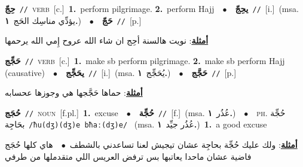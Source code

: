 \documentclass[10pt,a4paper,twoside]{article} %
\begin{document}
\begin{multicols}{2}
{{{{{{{{{{{\setlength\topsep{0pt}\textbf{\foreignlanguage{arabic}{حِجّ}}\ {\color{gray}\texttt{//}\color{black}}\ \textsc{verb}\ [c.]\ \textbf{1.}~perform pilgrimage.  \textbf{2.}~perform Hajj\ \ $\bullet$\ \ \setlength\topsep{0pt}\textbf{\foreignlanguage{arabic}{يحِجّ}}\ {\color{gray}\texttt{//}\color{black}}\ [i.]\ \color{gray}(msa. \foreignlanguage{arabic}{يؤدِّي مناسِك الحَج}~\foreignlanguage{arabic}{\textbf{١.}})\color{black}\ \ $\bullet$\ \ \setlength\topsep{0pt}\textbf{\foreignlanguage{arabic}{حَجّ}}\ {\color{gray}\texttt{//}\color{black}}\ [p.]\  \begin{flushright}\color{gray}\foreignlanguage{arabic}{\textbf{\underline{\foreignlanguage{arabic}{أمثلة}}}: نويت هالسنة أحِج ان شاء الله عروح إِمي الله يرحمها}\end{flushright}\color{black}} \vspace{2mm}

{\setlength\topsep{0pt}\textbf{\foreignlanguage{arabic}{حَجِّج}}\ {\color{gray}\texttt{//}\color{black}}\ \textsc{verb}\ [c.]\ \textbf{1.}~make sb perform pilgrimage.  \textbf{2.}~make sb perform Hajj (causative)\ \ $\bullet$\ \ \setlength\topsep{0pt}\textbf{\foreignlanguage{arabic}{يحَجِّج}}\ {\color{gray}\texttt{//}\color{black}}\ [i.]\ \color{gray}(msa. \foreignlanguage{arabic}{يُحَجِّج}~\foreignlanguage{arabic}{\textbf{١.}})\color{black}\ \ $\bullet$\ \ \setlength\topsep{0pt}\textbf{\foreignlanguage{arabic}{حَجَّج}}\ {\color{gray}\texttt{//}\color{black}}\ [p.]\  \begin{flushright}\color{gray}\foreignlanguage{arabic}{\textbf{\underline{\foreignlanguage{arabic}{أمثلة}}}: حماها حَجَّجها هي وجوزها عحسابه}\end{flushright}\color{black}} \vspace{2mm}

{\setlength\topsep{0pt}\textbf{\foreignlanguage{arabic}{حُجَج}}\ {\color{gray}\texttt{//}\color{black}}\ \textsc{noun}\ [f.pl.]\ \textbf{1.}~excuse\ \ $\bullet$\ \ \setlength\topsep{0pt}\textbf{\foreignlanguage{arabic}{حُجِّة}}\ {\color{gray}\texttt{//}\color{black}}\ [f.]\ \color{gray}(msa. \foreignlanguage{arabic}{عُذُر}~\foreignlanguage{arabic}{\textbf{١.}})\color{black}\ \ $\bullet$\ \ \textsc{ph.} \color{gray} \foreignlanguage{arabic}{حُجِّة بحَاجِة}\color{black}\ {\color{gray}\texttt{/{\sffamily ħu(dʒ)(dʒ)e bħaː(dʒ)e}/}\color{black}}\ \color{gray} (msa. \foreignlanguage{arabic}{عُذُر جيِّد}~\foreignlanguage{arabic}{\textbf{١.}})\color{black}\ \textbf{1.}~a good excuse\  \begin{flushright}\color{gray}\foreignlanguage{arabic}{\textbf{\underline{\foreignlanguage{arabic}{أمثلة}}}: ولك عليك حُجِّة بحاجِة عشان تيجيش لعنا تساعدني بالشطف\ $\bullet$\ \  هاي كلها حُجَج فاضية عشان ماحدا يعاتبها بس ترفض العريس اللي متقدملها من طرفي}\end{flushright}\color{black}} \vspace{2mm}

}}}}}}}}}}
\end{multicols}
\end{document}
